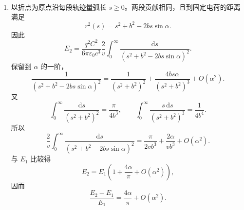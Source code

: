 \begin{question}[带电粒子受固定点电荷散射时的辐射损失]
\begin{solution}
\begin{enumerate}
  \item 以折点为原点沿每段轨迹量弧长 $s\geq0$。两段贡献相同，且到固定电荷的距离满足
  \[
    r^2(s)=s^2+b^2-2bs\sin\alpha .
  \]
  因此
  \[
    E_2=\frac{q^2C^2}{6\pi\varepsilon_0c^3}\frac{2}{v}
    \int_0^\infty\frac{\mathrm ds}{(s^2+b^2-2bs\sin\alpha)^2} .
  \]
  保留到 $\alpha$ 的一阶，
  \[
    \frac1{(s^2+b^2-2bs\sin\alpha)^2}
    =\frac1{(s^2+b^2)^2}
    +\frac{4bs\alpha}{(s^2+b^2)^3}+O(\alpha^2) .
  \]
  又
  \[
    \int_0^\infty\frac{\mathrm ds}{(s^2+b^2)^2}=\frac{\pi}{4b^3},
    \qquad
    \int_0^\infty\frac{s\,\mathrm ds}{(s^2+b^2)^3}=\frac{1}{4b^4} .
  \]
  所以
  \[
    \frac{2}{v}\int_0^\infty\frac{\mathrm ds}{(s^2+b^2-2bs\sin\alpha)^2}
    =\frac{\pi}{2vb^3}+\frac{2\alpha}{vb^3}+O(\alpha^2) .
  \]
  与 $E_1$ 比较得
  \[
    \boxed{E_2=E_1\left(1+\frac{4\alpha}{\pi}+O(\alpha^2)\right)} ,
  \]
  因而
  \[
    \boxed{\frac{E_2-E_1}{E_1}=\frac{4\alpha}{\pi}+O(\alpha^2)} .
  \]
\end{enumerate}
\end{solution}
\end{question}
